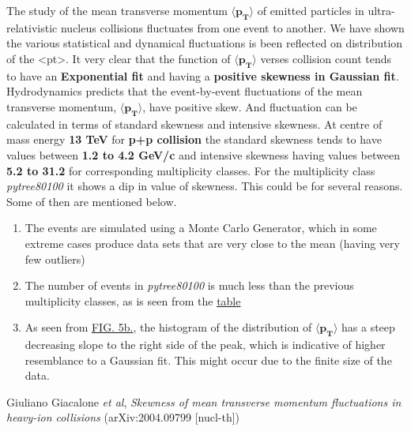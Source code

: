 \documentclass[letterpaper,aps,prc,superscriptaddress,nofootinbib,10pt,showpacs,floatfix]{revtex4-2}
\begin{document}
The study of the mean transverse momentum $\mathbf{\langle p_T\rangle }$ of emitted particles in ultra-relativistic nucleus collisions fluctuates from one event to another. We have shown the various statistical and dynamical fluctuations is been reflected on distribution of the <pt>. It very clear that the function of $\mathbf{\langle p_T\rangle }$ verses collision count tends to have an \textbf{Exponential fit} and having a \textbf{positive skewness in Gaussian fit}. Hydrodynamics predicts that the event-by-event fluctuations of the mean transverse momentum, $\mathbf{\langle p_T\rangle }$, have positive skew. And fluctuation can be calculated in terms of standard skewness and intensive skewness. At centre of mass energy \textbf{13 TeV} for \textbf{p+p collision} the standard skewness tends to have values between \textbf{1.2 to 4.2 GeV/c} and intensive skewness having values between \textbf{5.2 to 31.2} for corresponding multiplicity classes. For the multiplicity class \textit{pytree80100} it shows a dip in value of skewness. This could be for several reasons. Some of then are mentioned below.
\begin{enumerate}[label=(\roman*)]
\itemsep0em 
\item The events are simulated using a Monte Carlo Generator, which in some extreme cases produce data sets that are very close to the mean (having very few outliers)
\item The number of events in \textit{pytree80100} is much less than the previous multiplicity classes, as is seen from the \hyperref[subsubsec:summary]{table}
\item As seen from \hyperref[Fig:5b]{FIG. 5b.}, the histogram of the distribution of $\mathbf{\langle p_T\rangle }$ has a steep decreasing slope to the right side of the peak, which is indicative of higher resemblance to a Gaussian fit. This might occur due to the finite size of the data. 
\end{enumerate}



\begin{thebibliography}{50}
\medskip


  

  Giuliano Giacalone {\it et al}, \textit{Skewness of mean transverse momentum fluctuations in heavy-ion collisions} (arXiv:2004.09799 [nucl-th])

\end{thebibliography}
\end{document}
